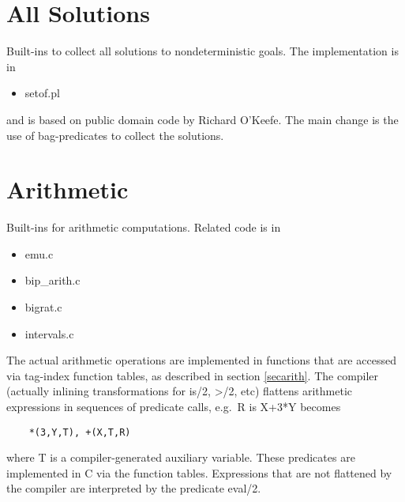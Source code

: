 %
% 
% 
% 
% 


\section{All Solutions }
     Built-ins to collect all solutions to nondeterministic goals.
     The implementation is in
     \begin{itemize}
     \item setof.pl
     \end{itemize}
     and is based on
     public domain code by Richard O'Keefe. The main change is the
     use of {\eclipse} bag-predicates to collect the solutions.

\section{Arithmetic }
Built-ins for arithmetic computations. Related code is in
     \begin{itemize}
     \item emu.c
     \item bip_arith.c
     \item bigrat.c
     \item intervals.c
     \end{itemize}
The actual arithmetic operations are implemented in functions that are
accessed via tag-index function tables, as described in section
\ref{secarith}.
The compiler (actually inlining transformations for is/2, >/2, etc)
flattens arithmetic expressions in sequences of predicate
calls, e.g.\ R is X+3*Y becomes
\begin{verbatim}
    *(3,Y,T), +(X,T,R)
\end{verbatim}
where T is a compiler-generated auxiliary variable. These predicates
are implemented in C via the function tables.  Expressions that are not
flattened by the compiler are interpreted by the predicate eval/2.


